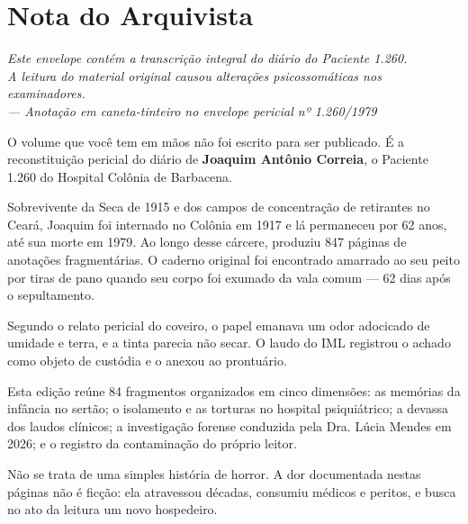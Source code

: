 \cleardoublepage
\thispagestyle{empty}
\chapter*{Nota do Arquivista}

\begin{center}
\itshape\small
Este envelope contém a transcrição integral do diário do Paciente 1.260.\\
A leitura do material original causou alterações psicossomáticas nos examinadores.\\[0.5em]
\upshape\scriptsize --- Anotação em caneta-tinteiro no envelope pericial nº 1.260/1979
\end{center}

\vspace{1.2em}

\begingroup

O volume que você tem em mãos não foi escrito para ser publicado. É a reconstituição pericial do diário de \textbf{Joaquim Antônio Correia}, o Paciente 1.260 do Hospital Colônia de Barbacena.

Sobrevivente da Seca de 1915 e dos campos de concentração de retirantes no Ceará, Joaquim foi internado no Colônia em 1917 e lá permaneceu por 62 anos, até sua morte em 1979. Ao longo desse cárcere, produziu 847 páginas de anotações fragmentárias. O caderno original foi encontrado amarrado ao seu peito por tiras de pano quando seu corpo foi exumado da vala comum --- 62 dias após o sepultamento.

\vspace{0.4em}
\noindent Segundo o relato pericial do coveiro, o papel emanava um odor adocicado de umidade e terra, e a tinta parecia não secar. O laudo do IML registrou o achado como objeto de custódia e o anexou ao prontuário.

\vspace{0.6em}
Esta edição reúne 84 fragmentos organizados em cinco dimensões: as memórias da infância no sertão; o isolamento e as torturas no hospital psiquiátrico; a devassa dos laudos clínicos; a investigação forense conduzida pela Dra. Lúcia Mendes em 2026; e o registro da contaminação do próprio leitor.

\vspace{0.6em}
Não se trata de uma simples história de horror. A dor documentada nestas páginas não é ficção: ela atravessou décadas, consumiu médicos e peritos, e busca no ato da leitura um novo hospedeiro.


